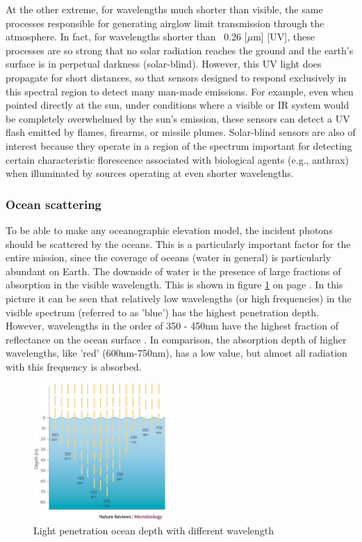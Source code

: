 At the other extreme, for wavelengths much shorter than visible, the same processes responsible for generating airglow limit transmission through the atmosphere. In fact, for wavelengths shorter than ~0.26 [$\mu$m] [\ac{UV}], these processes are so strong that no solar radiation reaches the ground and the earth's surface is in perpetual darkness (solar-blind). However, this \acs{UV} light does propagate for short distances, so that sensors designed to respond exclusively in this spectral region to detect many man-made emissions. For example, even when pointed directly at the sun, under conditions where a visible or \ac{IR} system would be completely overwhelmed by the sun's emission, these sensors can detect a UV flash emitted by flames, firearms, or missile plumes. Solar-blind sensors are also of interest because they operate in a region of the spectrum important for detecting certain characteristic florescence associated with biological agents (e.g., anthrax) when illuminated by sources operating at even shorter wavelengths. 

\subsubsection{Ocean scattering}
\label{introOcean}
To be able to make any oceanographic elevation model, the incident photons should be scattered by the oceans. This is a particularly important factor for the entire mission, since the coverage of oceans (water in general) is particularly abundant on Earth. The downside of water is the presence of large fractions of absorption in the visible wavelength. This is shown in figure \ref{fig:intro_ocean_penetrate} on page \pageref{fig:intro_ocean_penetrate}. In this picture it can be seen that relatively low wavelengths (or high frequencies) in the visible spectrum (referred to as 'blue') has the highest penetration depth. However, wavelengths in the order of 350 - 450nm have the highest fraction of reflectance on the ocean surface \cite{ocean_scattering}. In comparison, the absorption depth of higher wavelengths, like 'red' (600nm-750nm), has a low value, but almost all radiation with this frequency is absorbed. 

\begin{figure}[ht!]
\centering
\includegraphics[width=0.45\textwidth]{chapters/img/Ocean_absorption.jpg}
\caption{Light penetration ocean depth with different wavelength}
\label{fig:intro_ocean_penetrate}
\end{figure}

